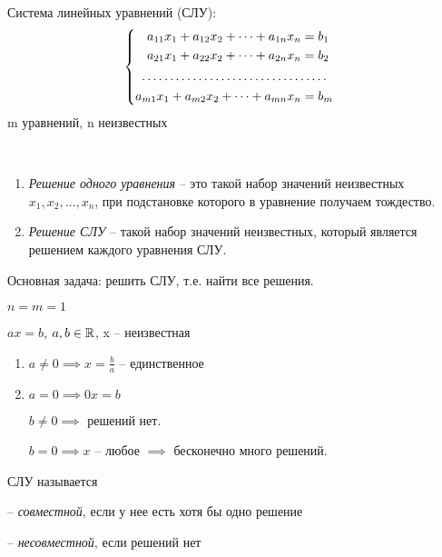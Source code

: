\bigskip
Система линейных уравнений (СЛУ):
\begin{equation*}
    \begin{cases}
        \begin{aligned}
            a_{11} x_1 + a_{12} x_2 + \cdots + a_{1n} x_n &= b_1 \\
            a_{21} x_1 + a_{22} x_2 + \cdots + a_{2n} x_n &= b_2 \\
            \hdotsfor{2} \\
            a_{m1} x_1 + a_{m2} x_2 + \cdots + a_{mn} x_n &= b_m \\
        \end{aligned}
    \end{cases}
\end{equation*}
m уравнений, n неизвестных

\begin{definition}~
    \begin{enumerate}
    \item \textit{Решение одного уравнения} -- это такой набор значений неизвестных $x_1, x_2, \dots, x_n$, при подстановке которого в уравнение получаем тождество.
    \item \textit{Решение СЛУ} -- такой набор значений неизвестных, который является решением каждого уравнения СЛУ.
    \end{enumerate}
\end{definition}

Основная задача: решить СЛУ, т.е. найти все решения.

\bigskip
\begin{example}

    $n = m = 1$

    $ax = b$, $a, b \in \mathbb{R}$, x -- неизвестная

    \begin{enumerate}
    \item $a \neq 0 \implies x = \frac{b}{a}$ -- единственное

    \item $a = 0 \implies 0x = b$

        $b \neq 0 \implies$ решений нет.

        $b = 0 \implies x$ -- любое $\implies$ бесконечно много решений.
    \end{enumerate}
\end{example}

\begin{definition}
    СЛУ называется 

    -- \textit{совместной}, если у нее есть хотя бы одно решение

    -- \textit{несовместной}, если решений нет
\end{definition}

